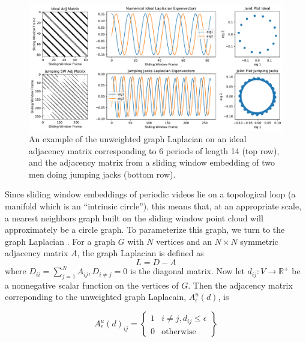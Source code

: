 \documentclass{article}
\begin{document}
\begin{figure}[h!]
\centering
\includegraphics[width=\columnwidth]{CirculantExample.pdf}
\caption{An example of the unweighted graph Laplacian on an ideal adjacency matrix corresponding to 6 periods of length 14 (top row), and the adjacency matrix from a sliding window embedding of two men doing jumping jacks (bottom row).  }
\label{fig:CirculantExample}
\end{figure}

Since sliding window embeddings of periodic videos lie on a topological loop (a manifold which is an ``intrinsic circle''), this means that, at an appropriate scale, a nearest neighbors graph built on the sliding window point cloud will approximately be a circle graph.  To parameterize this graph, we turn to the graph Laplacian \cite{chung1997spectral}.  For a graph $G$ with $N$ vertices and an $N \times N$ symmetric adjacency matrix $A$, the graph Laplacian is defined as
\begin{equation}
L = D-A
\end{equation}
where $D_{ii} = \sum_{j = 1}^N A_{ij}, D_{i \neq j} = 0$ is the diagonal matrix.  Now let $d_{ij}: V \rightarrow \mathbb{R}^+$ be a nonnegative scalar function on the vertices of $G$.  Then the adjacency matrix correponding to the unweighted graph Laplacain, $A_{\epsilon}^u(d)$, is

\begin{equation}
A_{\epsilon}^u(d)_{ij} = \left\{ \begin{array}{cc} 1 & i \neq j, d_{ij} \leq \epsilon \\ 0 & \text{otherwise} \end{array} \right\}
\end{equation}
\end{document}

